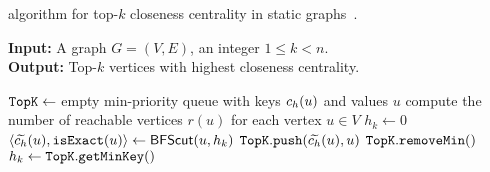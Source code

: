 \begin{algorithm}[t]
\small
\caption{\small\nbcut algorithm for top-$k$
closeness centrality in static
graphs~\cite{DBLP:journals/tkdd/BergaminiBCMM19}.}
\label{algo:nbcut}
\textbf{Input:} A graph $G = (V, E)$, an integer $1 \le k < n$.\\
\textbf{Output:} Top-$k$ vertices with highest closeness centrality.
\begin{algorithmic}[1]
\State$\texttt{TopK} \gets$ empty min-priority queue with keys $c_h(u)$ and values $u$
\State compute the number of reachable vertices $r(u)$ for each vertex $u \in V$
\State$h_k \gets 0$\label{line:nbcut-vk-init}
\label{line:nbcut-for}
\State$\left<\harmupp(u), \isexact(u)\right> \gets \bfscut(u, h_k)$
\label{line:nbcut-bfscut}
\State$\texttt{TopK}.\texttt{push}(\widetilde{c_h}(u), u)$\label{line:nbcut-update-topk1}
\State$\texttt{TopK}.\texttt{removeMin}()$
\EndIf
{}
\State$h_k \gets \texttt{TopK}.\texttt{getMinKey}()$\label{line:nbcut-update-topk2}
\EndIf
\EndIf
\EndFor
\State\Return\topk
\end{algorithmic}
\end{algorithm}

